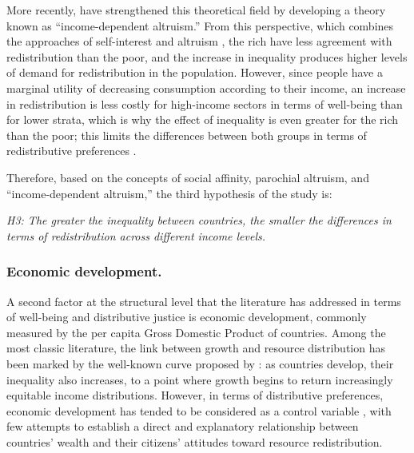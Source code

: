 \documentclass[utf8]{frontiersSCNS} %
\begin{document}
More recently, \textcite{Dimick2016, Dimick2018} have strengthened this theoretical field by developing a theory known as “income-dependent altruism.” From this perspective, which combines the approaches of self-interest and altruism \parencite{Dimick2018}, the rich have less agreement with redistribution than the poor, and the increase in inequality produces higher levels of demand for redistribution in the population. However, since people have a marginal utility of decreasing consumption according to their income, an increase in redistribution is less costly for high-income sectors in terms of well-being than for lower strata, which is why the effect of inequality is even greater for the rich than the poor; this limits the differences between both groups in terms of redistributive preferences \parencite{Dimick2016}.

Therefore, based on the concepts of social affinity, parochial altruism, and “income-dependent altruism,” the third hypothesis of the study is:

\textit{H3: The greater the inequality between countries, the smaller the differences in terms of redistribution across different income levels.}

\subsubsection{Economic development.}

A second factor at the structural level that the literature has addressed in terms of well-being and distributive justice is economic development, commonly measured by the per capita Gross Domestic Product of countries. Among the most classic literature, the link between growth and resource distribution has been marked by the well-known curve proposed by \textcite{KuznetsEconomicGrowthIncome1955}: as countries develop, their inequality also increases, to a point where growth begins to return increasingly equitable income distributions.  However, in terms of distributive preferences, economic development has tended to be considered as a control variable \parencite{RudraGlobalizationDeclineWelfare2002, Schmidt-CatranEconomicinequalitypublic2016, SchroderIncomeInequalityRelated2017}, with few attempts to establish a direct and explanatory relationship between countries’ wealth and their citizens’ attitudes toward resource redistribution.
\end{document}
